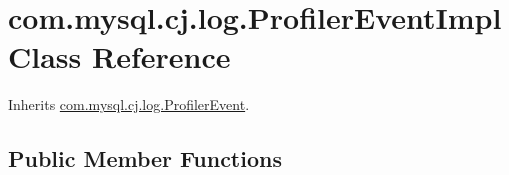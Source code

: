 \hypertarget{classcom_1_1mysql_1_1cj_1_1log_1_1_profiler_event_impl}{}\section{com.\+mysql.\+cj.\+log.\+Profiler\+Event\+Impl Class Reference}
\label{classcom_1_1mysql_1_1cj_1_1log_1_1_profiler_event_impl}


Inherits \mbox{\hyperlink{interfacecom_1_1mysql_1_1cj_1_1log_1_1_profiler_event}{com.\+mysql.\+cj.\+log.\+Profiler\+Event}}.

\subsection*{Public Member Functions}
